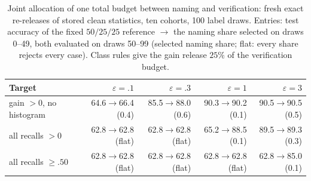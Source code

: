 \begin{table}[t]
\caption{Joint allocation of one total budget between naming and verification: fresh exact re-releases of stored clean statistics, ten cohorts, 100 label draws. Entries: test accuracy of the fixed $50/25/25$ reference $\to$ the naming share selected on draws 0--49, both evaluated on draws 50--99 (selected naming share; flat: every share rejects every case). Class rules give the gain release $25\%$ of the verification budget.}
\label{tab:allocation}\small
\centering
\begin{tabular}{@{}lrrrr@{}}\toprule
Target & $\varepsilon=.1$ & $\varepsilon=.3$ & $\varepsilon=1$ & $\varepsilon=3$ \\
\midrule
gain $>0$, no histogram & 64.6$\to$66.4 (0.4) & 85.5$\to$88.0 (0.6) & 90.3$\to$90.2 (0.1) & 90.5$\to$90.5 (0.5) \\
all recalls $>0$ & 62.8$\to$62.8 (flat) & 62.8$\to$62.8 (flat) & 65.2$\to$88.5 (0.1) & 89.5$\to$89.3 (0.3) \\
all recalls $\ge.50$ & 62.8$\to$62.8 (flat) & 62.8$\to$62.8 (flat) & 62.8$\to$62.8 (flat) & 62.8$\to$85.0 (0.1) \\
\bottomrule\end{tabular}
\end{table}
